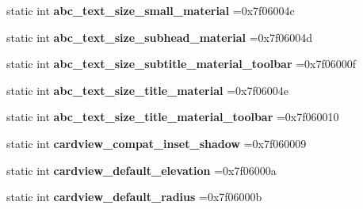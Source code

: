 \begin{DoxyCompactItemize}
\item 
\mbox{\label{classandroid_1_1support_1_1design_1_1R_1_1dimen_aff4d99785a341259b01ae1735d94fa8d}} 
static int {\bfseries abc\+\_\+text\+\_\+size\+\_\+small\+\_\+material} =0x7f06004c
\item 
\mbox{\label{classandroid_1_1support_1_1design_1_1R_1_1dimen_a117b26069534d90122d8a61254c30526}} 
static int {\bfseries abc\+\_\+text\+\_\+size\+\_\+subhead\+\_\+material} =0x7f06004d
\item 
\mbox{\label{classandroid_1_1support_1_1design_1_1R_1_1dimen_aae8c73ce691406e04bb0bbc3750d32f7}} 
static int {\bfseries abc\+\_\+text\+\_\+size\+\_\+subtitle\+\_\+material\+\_\+toolbar} =0x7f06000f
\item 
\mbox{\label{classandroid_1_1support_1_1design_1_1R_1_1dimen_a26f3796e79f40cae131712f3e987e0d5}} 
static int {\bfseries abc\+\_\+text\+\_\+size\+\_\+title\+\_\+material} =0x7f06004e
\item 
\mbox{\label{classandroid_1_1support_1_1design_1_1R_1_1dimen_ad9e163b855a7262d71ed47df3b7dd559}} 
static int {\bfseries abc\+\_\+text\+\_\+size\+\_\+title\+\_\+material\+\_\+toolbar} =0x7f060010
\item 
\mbox{\label{classandroid_1_1support_1_1design_1_1R_1_1dimen_ace4e357496d80ac3756d4725d06d1fd9}} 
static int {\bfseries cardview\+\_\+compat\+\_\+inset\+\_\+shadow} =0x7f060009
\item 
\mbox{\label{classandroid_1_1support_1_1design_1_1R_1_1dimen_aae2d33e553385aaec8df4bf8c99adfd7}} 
static int {\bfseries cardview\+\_\+default\+\_\+elevation} =0x7f06000a
\item 
\mbox{\label{classandroid_1_1support_1_1design_1_1R_1_1dimen_af5f6fdfd0d783172e94b756d654e3729}} 
static int {\bfseries cardview\+\_\+default\+\_\+radius} =0x7f06000b
\item 

\end{DoxyCompactItemize}
